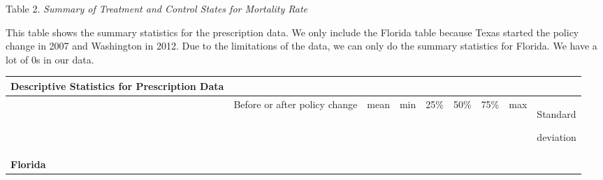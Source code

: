 \documentclass{article}
\begin{document}
Table 2. \emph{Summary of Treatment and Control States for Mortality
Rate}

This table shows the summary statistics for the prescription data. We
only include the Florida table because Texas started the policy change
in 2007 and Washington in 2012. Due to the limitations of the data, we
can only do the summary statistics for Florida. We have a lot of 0s in
our data.

\hspace{0pt}\hspace{0pt}

\begin{longtable}[]{@{}lllllllll@{}}
\toprule
\textbf{Descriptive Statistics for Prescription Data} & & & & & & &
&\tabularnewline
\midrule
\endhead
\begin{minipage}[t]{0.08\columnwidth}\raggedright
\strut
\end{minipage} & \begin{minipage}[t]{0.08\columnwidth}\raggedright
Before or after policy change\strut
\end{minipage} & \begin{minipage}[t]{0.08\columnwidth}\raggedright
mean\strut
\end{minipage} & \begin{minipage}[t]{0.08\columnwidth}\raggedright
min\strut
\end{minipage} & \begin{minipage}[t]{0.08\columnwidth}\raggedright
25\%\strut
\end{minipage} & \begin{minipage}[t]{0.08\columnwidth}\raggedright
50\%\strut
\end{minipage} & \begin{minipage}[t]{0.08\columnwidth}\raggedright
75\%\strut
\end{minipage} & \begin{minipage}[t]{0.08\columnwidth}\raggedright
max\strut
\end{minipage} & \begin{minipage}[t]{0.08\columnwidth}\raggedright
Standard

deviation\strut
\end{minipage}\tabularnewline
\begin{minipage}[t]{0.08\columnwidth}\raggedright
\textbf{Florida}


\end{minipage}
\end{longtable}
\end{document}
